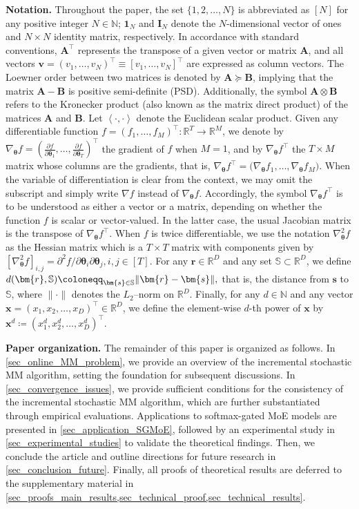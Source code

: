 \documentclass{article}
\newcommand{\md}{softmax-gated MoE }
\let\inf\relax
\DeclareMathOperator*\inf{\vphantom{p}inf}
\def\nset{{\mathbb{N}}}
\def\rset{\mathbb{R}}
\newcommand{\pscal}[2]{\left\langle#1,#2\right\rangle} %
\def\vtheta{{\bm{\theta}}}
\def\vr{{\bm{r}}}
\def\vs{{\bm{s}}}
\def\vv{{\bm{v}}}
\def\vx{{\bm{x}}}
\def\evv{{v}}
\def\mA{{\bm{A}}}
\def\mB{{\bm{B}}}
\def\mI{{\bm{I}}}
\def\sS{{\mathbb{S}}}
\begin{document}
{\bf Notation.}
Throughout the paper, the set $\{1, 2, \ldots, N\}$ is abbreviated as $[N]$ for any positive integer $N \in \nset$; $\bm{1}_N$ and $\mI_{N}$ denote the $N$-dimensional vector of ones and $N\times N$ identity matrix, respectively. In accordance with standard conventions, $\mA^\top$ represents the transpose of a given vector or matrix $\mA$, and all vectors $\vv = (\evv_1,\ldots,\evv_N)^\top \equiv [\evv_1,\ldots,\evv_N]^\top$ are expressed as column vectors. The Loewner order between two matrices is denoted by $\mA \succeq \mB$, implying that the matrix $\mA - \mB$ is positive semi-definite (PSD). Additionally, the symbol $\mA \otimes \mB$ refers to the Kronecker product (also known as the matrix direct product) of the matrices $\mA$ and $\mB$.
Let $\pscal{\cdot}{\cdot}$ denote the Euclidean scalar product. 
Given any differentiable function $f = (f_1,\ldots,f_M)^\top : \rset^T \to \rset^M$, we denote by
$\nabla_{\vtheta} f 
= \left( \frac{\partial f}{\partial \vtheta_1}, \ldots, \frac{\partial f}{\partial \vtheta_T} \right)^\top$
the gradient of $f$ when $M=1$, and by $\nabla_{\vtheta} f^\top$ the $T \times M$ matrix whose columns are the gradients, that is,
$\nabla_{\vtheta} f^\top = \big(\nabla_{\vtheta} f_1, \ldots, \nabla_{\vtheta} f_M\big).$
When the variable of differentiation is clear from the context, we may omit the subscript and simply write $\nabla f$ instead of $\nabla_{\vtheta} f$.
Accordingly, the symbol $\nabla_\vtheta f^\top$ is to be understood as either a vector or a matrix, depending on whether the function $f$ is scalar or vector-valued. In the latter case, the usual Jacobian matrix is the transpose of $\nabla_\vtheta f^\top$.
When $f$ is twice differentiable, we use the notation $\nabla^2_\vtheta f$ as the Hessian matrix which is a $T\times T$ matrix with components given by $[\nabla^2_\vtheta f]_{i,j} =\partial^2 f/\partial \vtheta_i\partial \vtheta_j, i,j \in[T]$.
For any $\vr \in \rset^D$ and any set $\sS \subset \rset^D$, we define
$d(\vr,\sS) \coloneqq \inf_{\vs \in \sS} \|\vr-\vs\|,$
that is, the distance from $\vs$ to $\sS$, where $\|\cdot\|$ denotes the $L_2$–norm on $\rset^D$.
Finally, for any $d \in \mathbb{N}$ and any vector $\vx = (x_1, x_2, \dots, x_D)^\top \in \rset^D$, we define the element-wise $d$-th power of $\vx$ by $\vx^d \coloneqq (x_1^d, x_2^d, \dots, x_D^d)^\top.$

{\bf Paper organization.}
The remainder of this paper is organized as follows. In \cref{sec_online_MM_problem}, we provide an overview of the incremental stochastic MM algorithm, setting the foundation for subsequent discussions. In \cref{sec_convergence_issues}, we provide sufficient conditions for the consistency
of the incremental stochastic MM algorithm, which are further substantiated through empirical evaluations. Applications to \md models are presented in \cref{sec_application_SGMoE}, followed by an experimental study in \cref{sec_experimental_studies} to validate the theoretical findings. Then, we conclude the article and outline directions for future research in \cref{sec_conclusion_future}. Finally, all proofs of theoretical results are deferred to the supplementary material in \cref{sec_proofs_main_results,sec_technical_proof,sec_technical_results}.
\end{document}
